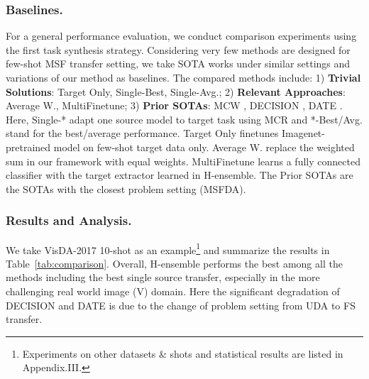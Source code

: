 \documentclass[letterpaper]{article} %
\begin{document}
\subsubsection{Baselines.}
For a general performance evaluation, we conduct comparison experiments using the first task synthesis strategy. Considering very few methods are designed for few-shot MSF transfer setting, we take SOTA works under similar settings and variations of our method as baselines. The compared methods include: 1) \textbf{Trivial Solutions}: Target Only, Single-Best, Single-Avg.; 2) \textbf{Relevant Approaches}: Average W., MultiFinetune; 3) \textbf{Prior SOTAs}: MCW \citep{lee2019learning}, DECISION \citep{ahmed2021unsupervised}, DATE \citep{han2023discriminability}.
Here,
Single-* adapt one source model to target task using MCR and *-Best/Avg. stand for the best/average performance. Target Only finetunes Imagenet-pretrained model on few-shot target data only.
Average W. replace the weighted sum in our framework with
equal weights. MultiFinetune learns a fully connected classifier with the target extractor learned in H-ensemble.
The Prior SOTAs are the SOTAs with the closest problem setting (MSFDA).





\subsubsection{Results and Analysis.}

We take VisDA-2017 10-shot as an example\footnote{Experiments on other datasets \& shots and statistical results are listed in Appendix.III.} and summarize the results in Table~\ref{tab:comparison}. Overall,  H-ensemble performs the best among all the methods including the best single source transfer, especially in the more challenging real world image (V) domain. Here the significant degradation of DECISION and DATE is due to the change of problem setting from UDA to FS transfer.
\end{document}
